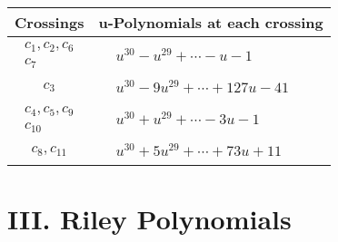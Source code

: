 \documentclass[1p]{elsarticle_modified}
\theoremstyle{definition}
\begin{document}
\begin{tabular}{m{50pt}|m{274pt}}
Crossings & \hspace{64pt}u-Polynomials at each crossing \\
\hline $$\begin{aligned}c_{1},c_{2},c_{6}\\c_{7}\end{aligned}$$&$\begin{aligned}
&u^{30}- u^{29}+\cdots- u-1
\end{aligned}$\\
\hline $$\begin{aligned}c_{3}\end{aligned}$$&$\begin{aligned}
&u^{30}-9 u^{29}+\cdots+127 u-41
\end{aligned}$\\
\hline $$\begin{aligned}c_{4},c_{5},c_{9}\\c_{10}\end{aligned}$$&$\begin{aligned}
&u^{30}+u^{29}+\cdots-3 u-1
\end{aligned}$\\
\hline $$\begin{aligned}c_{8},c_{11}\end{aligned}$$&$\begin{aligned}
&u^{30}+5 u^{29}+\cdots+73 u+11
\end{aligned}$\\
\hline
\end{tabular}\newpage\renewcommand{\arraystretch}{1}
\centering \section*{ III. Riley Polynomials}
\end{document}
